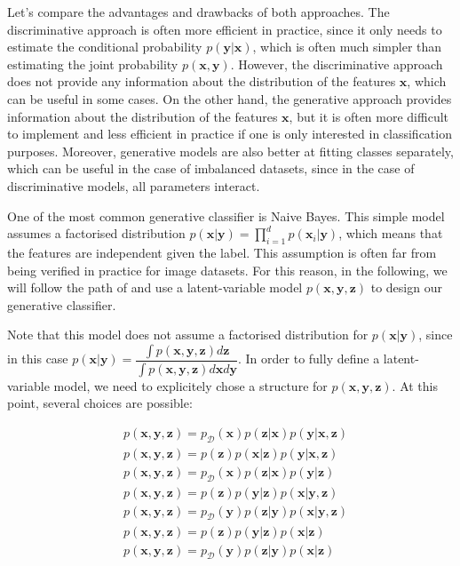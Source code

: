 \documentclass[11pt,twocolumn,letterpaper]{article}
\begin{document}
Let's compare the advantages and drawbacks of both approaches. The discriminative approach is often more efficient in practice, since it only needs to estimate the conditional probability $p(\bm{y}|\bm{x})$, which is often much simpler than estimating the joint probability $p(\bm{x}, \bm{y})$. However, the discriminative approach does not provide any information about the distribution of the features $\bm{x}$, which can be useful in some cases. On the other hand, the generative approach provides information about the distribution of the features $\bm{x}$, but it is often more difficult to implement and less efficient in practice if one is only interested in classification purposes. Moreover, generative models are also better at fitting classes separately, which can be useful in the case of imbalanced datasets, since in the case of discriminative models, all parameters interact. 

One of the most common generative classifier is Naive Bayes. This simple model assumes a factorised distribution $\displaystyle p(\bm{x}|\bm{y}) = \prod_{i=1}^d p(\bm{x}_i|\bm{y})$, which means that the features are independent given the label. This assumption is often far from being verified in practice for image datasets. For this reason, in the following, we will follow the path of \cite{main_paper} and use a latent-variable model $p(\bm{x}, \bm{y}, \bm{z})$ to design our generative classifier. 

Note that this model does not assume a factorised distribution for $p(\bm{x}|\bm{y})$, since in this case $p(\bm{x}|\bm{y}) = \displaystyle\dfrac{\int p(\bm{x}, \bm{y}, \bm{z}) d\bm{z}}{\int p(\bm{x}, \bm{y}, \bm{z}) d\bm{x} d\bm{y}}$. In order to fully define a latent-variable model, we need to explicitely chose a structure for $p(\bm{x}, \bm{y}, \bm{z})$. At this point, several choices are possible:

\begin{align*}
 & p(\bm{x}, \bm{y}, \bm{z}) = p_{\mathcal{D}}(\bm{x})p(\bm{z}|\bm{x})p(\bm{y}|\bm{x}, \bm{z}) \tag{DFX} \\
 & p(\bm{x}, \bm{y}, \bm{z}) = p(\bm{z})p(\bm{x}|\bm{z})p(\bm{y}|\bm{x}, \bm{z}) \tag{DFZ} \\
 & p(\bm{x}, \bm{y}, \bm{z}) = p_{\mathcal{D}}(\bm{x})p(\bm{z}|\bm{x})p(\bm{y}|\bm{z}) \tag{DBX} \\
 & p(\bm{x}, \bm{y}, \bm{z}) = p(\bm{z})p(\bm{y}|\bm{z})p(\bm{x}|\bm{y}, \bm{z}) \tag{GFZ} \\
 & p(\bm{x}, \bm{y}, \bm{z}) = p_{\mathcal{D}}(\bm{y})p(\bm{z}|\bm{y})p(\bm{x}|\bm{y}, \bm{z}) \tag{GFY} \\
 & p(\bm{x}, \bm{y}, \bm{z}) = p(\bm{z})p(\bm{y}|\bm{z})p(\bm{x}|\bm{z}) \tag{GBZ} \\
 & p(\bm{x}, \bm{y}, \bm{z}) = p_{\mathcal{D}}(\bm{y})p(\bm{z}|\bm{y})p(\bm{x}|\bm{z}) \tag{GBY} \\
\end{align*}
\end{document}
